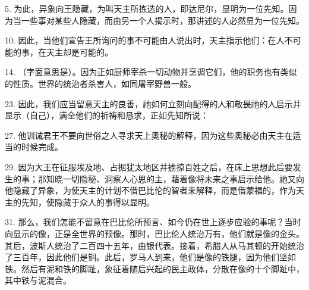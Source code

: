 5. 为此，异象向王隐藏，为叫天主所拣选的人，即达尼尔，显明为一位先知。因为当一些事对某些人隐藏，而由另一个人揭示时，那讲述的人必然显为一位先知。\par

10. 因此，当他们宣告王所询问的事不可能由人说出时，天主指示他们：在人不可能的事，在天主却是可能的。\par

14. （字面意思是）。因为正如厨师宰杀一切动物并烹调它们，他的职务也有类似的性质。世界的统治者杀害人，如同屠宰野兽一般。\par

23.  因此，我们应当留意天主的良善，祂如何立刻向配得的人和敬畏祂的人启示并显示（自己），满全他们的祈祷和恳求，正如先知所说：\par

27.  他训诫君王不要向世俗之人寻求天上奥秘的解释，因为这些奥秘必由天主在适当的时候完成。\par

29.  因为大王在征服埃及地、占据犹太地区并掳掠百姓之后，在床上思想此后要发生的事；那知晓一切隐秘、洞察人心思的主，藉着像将未来之事启示给他。祂又向他隐藏了异象，为使天主的计划不借巴比伦的智者来解释，而是借蒙福的，作为天主的先知，使隐藏于众人的事得以显明。\par

31.  那么，我们怎能不留意在巴比伦所预言、如今仍在世上逐步应验的事呢？当时向显示的像，正是全世界的预像。那时，巴比伦人统治万有，他们就是像的金头。其后，波斯人统治了二百四十五年，由银代表。接着，希腊人从马其顿的开始统治了三百年，因此他们是铜。此后，罗马人到来，他们是像的铁腿，因为他们坚如铁。然后有泥和铁的脚趾，象征着随后兴起的民主政体，分散在像的十个脚趾中，其中铁与泥混合。\par

